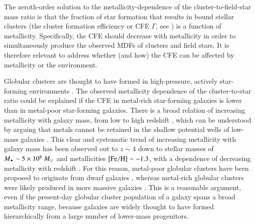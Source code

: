 \documentclass{aa}
\begin{document}
The zeroth-order solution to the metallicity-dependence of the cluster-to-field-star mass ratio is that the fraction of star formation that results in bound stellar clusters (the cluster formation efficiency or CFE $\Gamma$, see \citealt{bastian08}) is a function of metallicity. Specifically, the CFE should decrease with metallicity in order to simultaneously produce the observed MDFs of clusters and field stars. It is therefore relevant to address whether (and how) the CFE can be affected by metallicity or the environment. 

Globular clusters are thought to have formed in high-pressure, actively star-forming environments \citep[e.g.,][]{ashman92,elmegreen97,elmegreen10,shapiro10,kruijssen15b}. The observed metallicity dependence of the cluster-to-star ratio could be explained if the CFE in metal-rich star-forming galaxies is lower than in metal-poor star-forming galaxies. There is a broad relation of increasing metallicity with galaxy mass, from low to high redshift \citep[e.g.][]{tremonti04,erb06}, which can be understood by arguing that metals cannot be retained in the shallow potential wells of low-mass galaxies \citep[e.g.][]{maclow99}. 
This clear and systematic trend of increasing metallicity with galaxy mass has been observed out to $z\sim4$ down to stellar masses of $M_\star\sim5\times10^8~\mbox{$M_{\odot}$}$ and metallicities ${\rm [Fe/H]}\sim-1.3$, with a dependence of decreasing metallicity with redshift \citep{mannucci09}.
 For this reason, metal-poor globular clusters have been proposed to originate from dwarf galaxies \citep{elmegreen97,muratov10}, whereas metal-rich globular clusters were likely produced in more massive galaxies \citep{forbes97,shapiro10,kruijssen12c}. 
This is a reasonable argument, even if the present-day globular cluster population of a galaxy spans a broad metallicity range, because galaxies are widely thought to have formed hierarchically from a large number of lower-mass progenitors.
\end{document}
